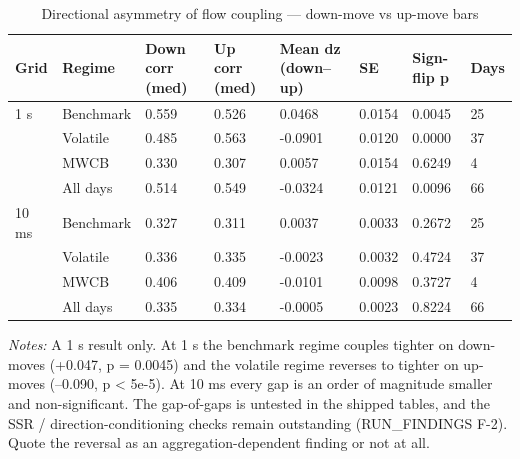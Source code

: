 \begin{table}[htbp]\centering
\caption{Directional asymmetry of flow coupling — down-move vs up-move bars}
\label{tab:t5}
\small
\begin{tabular}{llllllll}
\toprule
Grid & Regime & Down corr (med) & Up corr (med) & Mean dz (down--up) & SE & Sign-flip p & Days \\
\midrule
1 s & Benchmark & 0.559 & 0.526 & 0.0468 & 0.0154 & 0.0045 & 25 \\
 & Volatile & 0.485 & 0.563 & -0.0901 & 0.0120 & 0.0000 & 37 \\
 & MWCB & 0.330 & 0.307 & 0.0057 & 0.0154 & 0.6249 & 4 \\
 & All days & 0.514 & 0.549 & -0.0324 & 0.0121 & 0.0096 & 66 \\
\midrule
10 ms & Benchmark & 0.327 & 0.311 & 0.0037 & 0.0033 & 0.2672 & 25 \\
 & Volatile & 0.336 & 0.335 & -0.0023 & 0.0032 & 0.4724 & 37 \\
 & MWCB & 0.406 & 0.409 & -0.0101 & 0.0098 & 0.3727 & 4 \\
 & All days & 0.335 & 0.334 & -0.0005 & 0.0023 & 0.8224 & 66 \\
\bottomrule
\end{tabular}
\begin{minipage}{\linewidth}\vspace{2pt}\footnotesize\emph{Notes:} A 1 s result only. At 1 s the benchmark regime couples tighter on down-moves (+0.047, p = 0.0045) and the volatile regime reverses to tighter on up-moves (--0.090, p < 5e-5). At 10 ms every gap is an order of magnitude smaller and non-significant. The gap-of-gaps is untested in the shipped tables, and the SSR / direction-conditioning checks remain outstanding (RUN\_FINDINGS F-2). Quote the reversal as an aggregation-dependent finding or not at all.\end{minipage}
\end{table}
